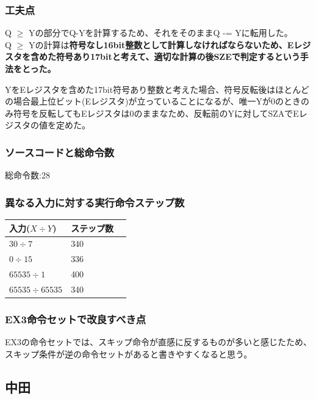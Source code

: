 \documentclass[dvipdfmx,12pt]{jreport}
\begin{document}
\subsubsection{工夫点}
Q $\geq$ Yの部分でQ-Yを計算するため、それをそのままQ -= Yに転用した。 \\
Q $\geq$ Yの計算は\bf{符号なし16bit}整数として計算しなければならないため、Eレジスタを含めた\bf{符号あり17bit}と考えて、適切な計算の後SZEで判定するという手法をとった。

YをEレジスタを含めた17bit符号あり整数と考えた場合、符号反転後はほとんどの場合最上位ビット(Eレジスタ)が立っていることになるが、唯一Yが0のときのみ符号を反転してもEレジスタは0のままなため、反転前のYに対してSZAでEレジスタの値を定めた。

\subsubsection{ソースコードと総命令数}

総命令数:28

\subsubsection{異なる入力に対する実行命令ステップ数}
\begin{table}[h]
  \begin{tabular}{|l|l|l|} \hline
    入力($X \div Y$) & ステップ数 \\ \hline
    $30 \div 7$ & 340 \\ \hline
    $0 \div 15$ & 336 \\ \hline
    $65535 \div 1$ & 400 \\ \hline
    $65535 \div 65535$ & 340 \\ \hline
  \end{tabular}
\end{table}

\subsubsection{EX3命令セットで改良すべき点}
EX3の命令セットでは、スキップ命令が直感に反するものが多いと感じたため、スキップ条件が逆の命令セットがあると書きやすくなると思う。



\subsection*{中田}
\end{document}
